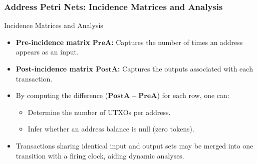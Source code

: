 \documentclass{beamer}
\begin{document}
\begin{frame}
    \frametitle{Address Petri Nets: Incidence Matrices and Analysis}
    \begin{block}{Incidence Matrices and Analysis}
        \begin{itemize}
            \item \textbf{Pre-incidence matrix \(\mathbf{PreA}\):} Captures the number of times an address appears as an input.
            \item \textbf{Post-incidence matrix \(\mathbf{PostA}\):} Captures the outputs associated with each transaction.
            \item By computing the difference (\(\mathbf{PostA} - \mathbf{PreA}\)) for each row, one can:
                  \begin{itemize}
                      \item Determine the number of UTXOs per address.
                      \item Infer whether an address balance is null (zero tokens).
                  \end{itemize}
            \item Transactions sharing identical input and output sets may be merged into one transition with a firing clock, aiding dynamic analyses.
        \end{itemize}
    \end{block}

\end{frame}
\end{document}
